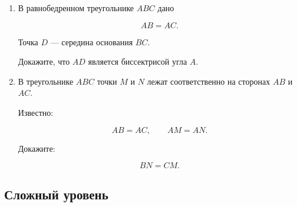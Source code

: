 \documentclass[a4paper,12pt]{article}
\begin{document}
\begin{enumerate}[
  label=\textbf{\arabic*.},
  start=4
]
\[
\angle BAC=\angle CAD.
\]

\item
В равнобедренном треугольнике $ABC$ дано

\[
AB=AC.
\]

Точка $D$ --- середина основания $BC$.

Докажите,
что $AD$ является биссектрисой угла $A$.

\item
В треугольнике $ABC$
точки $M$ и $N$ лежат соответственно
на сторонах $AB$ и $AC$.

Известно:

\[
AB=AC,
\qquad
AM=AN.
\]

Докажите:

\[
BN=CM.
\]

\begin{center}


\end{center}

\end{enumerate}

\subsection*{Сложный уровень}
\end{document}
